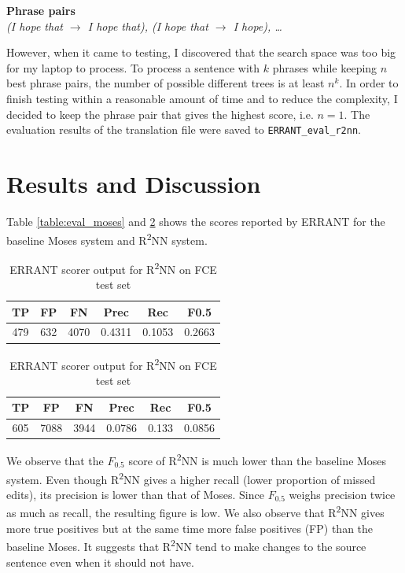 \documentclass[12pt,a4paper,twoside,openright]{report}
\begin{document}
\textbf{Phrase pairs}\\
\textit{(I hope that $\rightarrow$ I hope that),
        (I hope that $\rightarrow$ I hope),
        \dots}

However, when it came to testing, I discovered that the search space was too big for my laptop to process. To process a sentence with $k$ phrases while keeping $n$ best phrase pairs, the number of possible different trees is at least $n^k$. In order to finish testing within a reasonable amount of time and to reduce the complexity, I decided to keep the phrase pair that gives the highest score, i.e. $n=1$. The evaluation results of the translation file were saved to \texttt{ERRANT\_eval\_r2nn}.

\section{Results and Discussion}\label{section:results}
Table \ref{table:eval_moses} and \ref{table:eval_r2nn} shows the scores reported by ERRANT for the baseline Moses system and R\textsuperscript{2}NN system.

\begin{table}[ht]
    \centering
    \begin{tabular}{ |c|c|c|c|c|c| } 
     \hline
     TP & FP & FN & Prec & Rec & F0.5 \\ [0.5ex] 
     \hline
     479 & 632 & 4070 & 0.4311 & 0.1053 & 0.2663 \\ 
     \hline
    \end{tabular}
    \caption{ERRANT scorer output for Moses on FCE test set}
    \label{table:eval_moses}
    
    \vspace{1em}
    
    \begin{tabular}{ |c|c|c|c|c|c| } 
     \hline
     TP & FP & FN & Prec & Rec & F0.5 \\ [0.5ex] 
     \hline
     605 & 7088 & 3944 & 0.0786 & 0.133 & 0.0856 \\ 
     \hline
    \end{tabular}
    \caption{ERRANT scorer output for R\textsuperscript{2}NN on FCE test set}
    \label{table:eval_r2nn}
\end{table}

We observe that the $F_{0.5}$ score of R\textsuperscript{2}NN is much lower than the baseline Moses system. Even though R\textsuperscript{2}NN gives a higher recall (lower proportion of missed edits), its precision is lower than that of Moses. Since $F_{0.5}$ weighs precision twice as much as recall, the resulting figure is low. We also observe that R\textsuperscript{2}NN gives more true positives but at the same time more false positives (FP) than the baseline Moses. It suggests that R\textsuperscript{2}NN tend to make changes to the source sentence even when it should not have. 
\end{document}
